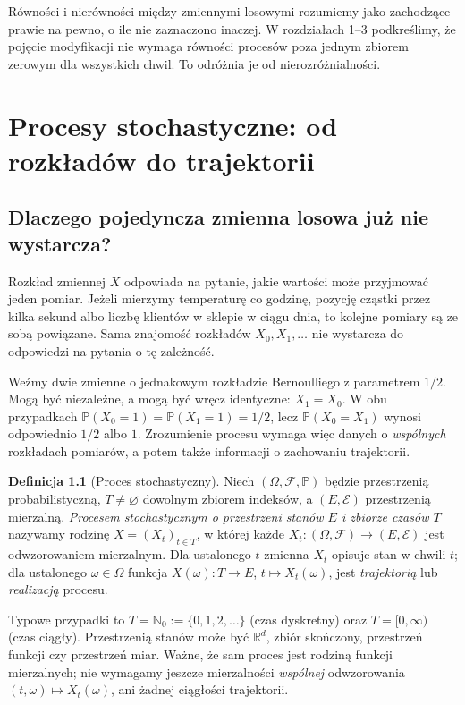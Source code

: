 \documentclass[11pt,a4paper,oneside]{report}
\numberwithin{equation}{chapter}
\theoremstyle{plain}
\theoremstyle{definition}
\newtheorem{definicja}{Definicja}[chapter]
\theoremstyle{remark}
\newcommand{\R}{\mathbb{R}}
\newcommand{\N}{\mathbb{N}}
\newcommand{\Prob}{\mathbb{P}}
\newcommand{\calF}{\mathcal{F}}
\newcommand{\calE}{\mathcal{E}}
\begin{document}
Równości i nierówności między zmiennymi losowymi rozumiemy
jako zachodzące prawie na pewno, o ile nie zaznaczono inaczej.
W rozdziałach 1--3 podkreślimy, że pojęcie modyfikacji nie wymaga
równości procesów poza jednym zbiorem zerowym dla wszystkich chwil.
To odróżnia je od nierozróżnialności.

\chapter{Procesy stochastyczne: od rozkładów do trajektorii}
\label{ch:procesy}

\section{Dlaczego pojedyncza zmienna losowa już nie wystarcza?}
Rozkład zmiennej $X$ odpowiada na pytanie, jakie wartości może przyjmować
jeden pomiar. Jeżeli mierzymy temperaturę co godzinę, pozycję cząstki
przez kilka sekund albo liczbę klientów w sklepie w ciągu dnia, to
kolejne pomiary są ze sobą powiązane. Sama znajomość rozkładów
$X_0,X_1,\ldots$ nie wystarcza do odpowiedzi na pytania o tę zależność.

Weźmy dwie zmienne o jednakowym rozkładzie Bernoulliego z parametrem
$1/2$. Mogą być niezależne, a mogą być wręcz identyczne: $X_1=X_0$.
W obu przypadkach $\Prob(X_0=1)=\Prob(X_1=1)=1/2$, lecz
$\Prob(X_0=X_1)$ wynosi odpowiednio $1/2$ albo $1$.
Zrozumienie procesu wymaga więc danych o \emph{wspólnych} rozkładach
pomiarów, a potem także informacji o zachowaniu trajektorii.

\begin{definicja}[Proces stochastyczny]
Niech $(\Omega,\calF,\Prob)$ będzie przestrzenią probabilistyczną,
$T\ne\varnothing$ dowolnym zbiorem indeksów, a $(E,\calE)$
przestrzenią mierzalną. \emph{Procesem stochastycznym o przestrzeni
stanów $E$ i zbiorze czasów $T$} nazywamy rodzinę
$X=(X_t)_{t\in T}$, w której każde
$X_t:(\Omega,\calF)\to(E,\calE)$ jest odwzorowaniem mierzalnym.
Dla ustalonego $t$ zmienna $X_t$ opisuje stan w chwili $t$;
dla ustalonego $\omega\in\Omega$ funkcja
$X(\omega):T\to E$, $t\mapsto X_t(\omega)$, jest
\emph{trajektorią} lub \emph{realizacją} procesu.
\end{definicja}

Typowe przypadki to $T=\N_0:=\{0,1,2,\ldots\}$ (czas dyskretny)
oraz $T=[0,\infty)$ (czas ciągły). Przestrzenią stanów może być
$\R^d$, zbiór skończony, przestrzeń funkcji czy przestrzeń miar.
Ważne, że sam proces jest rodziną funkcji mierzalnych; nie
wymagamy jeszcze mierzalności \emph{wspólnej} odwzorowania
$(t,\omega)\mapsto X_t(\omega)$, ani żadnej ciągłości trajektorii.
\end{document}
